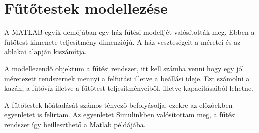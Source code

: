\section{Fűtőtestek modellezése}

A MATLAB egyik demójában egy ház fűtési modelljét valósították meg.
Ebben a fűtőtest kimenete teljesítmény dimenziójú. 
A ház veszteségeit a méretei és az ablakai alapján kiszámítja.

A modellezendő objektum a fűtési rendszer, itt kell számba venni hogy egy jól méretezett rendszernek mennyi a felfutási illetve a beállási ideje. Ezt számolni a kazán, a fűtővíz illetve a fűtőtest teljesítményeiből, illetve kapacitásaiból lehetne.

A fűtőtestek hőátadását számos tényező befolyásolja, ezekre az előzóekben egyenletet is felírtam. Az egyenletet Simulinkben valósítottam meg, a fűtési rendszer így beilleszthető a Matlab példájába.

%




\pagebreak
